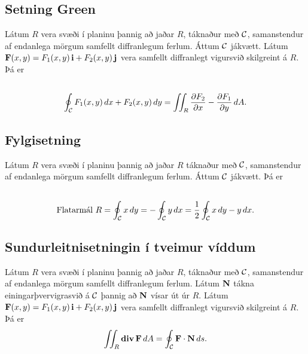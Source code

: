 \documentclass[a4paper,10pt,icelandic]{sphinxmanual}
\begin{document}
\subsection{Setning Green}
\label{Kafli6:index-4}\label{Kafli6:setning-green}
Látum \(R\) vera svæði í planinu þannig að jaðar \(R\), táknaður
með \(\cal C\), samanstendur af endanlega mörgum samfellt
diffranlegum ferlum. Áttum \(\cal C\) jákvætt. Látum
\(\mbox{${\bf F}$}(x,y)=F_1(x,y)\,\mbox{${\bf i}$}+F_2(x,y)\,\mbox{${\bf j}$}\)
vera samfellt diffranlegt vigursvið skilgreint á \(R\). Þá er
\begin{gather}
\begin{split}\displaystyle\end{split}\notag\\\begin{split}\oint_{\cal C}F_1(x,y)\,dx+F_2(x,y)\,dy=\int\!\!\!\int_R
\frac{\partial  F_2}{\partial x}-
\frac{\partial  F_1}{\partial y}\,dA.\end{split}\notag
\end{gather}

\subsection{Fylgisetning}
\label{Kafli6:fylgisetning}
Látum \(R\) vera svæði í planinu þannig að jaðar \(R\) táknaður
með \(\cal C\), samanstendur af endanlega mörgum samfellt
diffranlegum ferlum. Áttum \(\cal C\) jákvætt. Þá er
\begin{gather}
\begin{split}\displaystyle\end{split}\notag\\\begin{split}\mbox{Flatarmál } R=\oint_{\cal C}x\,dy=
-\oint_{\cal C}y\,dx=\frac{1}{2}\oint_{\cal C}x\,dy-y\,dx.\end{split}\notag
\end{gather}

\subsection{Sundurleitnisetningin í tveimur víddum}
\label{Kafli6:sundurleitnisetningin-i-tveimur-viddum}
Látum \(R\) vera svæði í planinu þannig að jaðar \(R\), táknaður
með \(\cal C\), samanstendur af endanlega mörgum samfellt
diffranlegum ferlum. Látum \(\mbox{${\bf N}$}\) tákna
einingarþvervigrasvið á \(\cal C\) þannig að
\(\mbox{${\bf N}$}\) vísar út úr \(R\). Látum
\(\mbox{${\bf F}$}(x,y)=F_1(x,y)\,\mbox{${\bf i}$}+F_2(x,y)\,\mbox{${\bf j}$}\)
vera samfellt diffranlegt vigursvið skilgreint á \(R\). Þá er
\begin{gather}
\begin{split}\displaystyle \int\!\!\!\int_R\mbox{${\rm\bf div\,}$}\mbox{${\bf F}$}\,dA=\oint_{\cal C} \mbox{${\bf F}$}\cdot\mbox{${\bf N}$}\,ds.\end{split}\notag
\end{gather}
\end{document}
